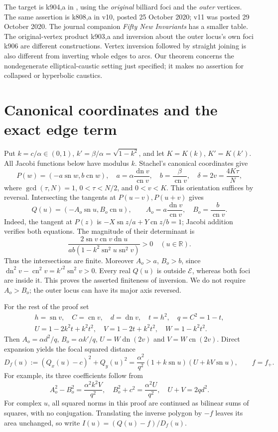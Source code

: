 \documentclass[11pt]{article}
\newcommand{\sn}{\operatorname{sn}}
\newcommand{\cn}{\operatorname{cn}}
\newcommand{\dn}{\operatorname{dn}}
\begin{document}
The target is k904,a in \cite[\S3.9, Table~10, p.~12]{RGK}, using the \emph{original} billiard foci and the \emph{outer} vertices. The same assertion is k808,a in v10, posted 25 October 2020; v11 was posted 29 October 2020. The journal companion \emph{Fifty New Invariants} has a smaller table. The original-vertex product k903,a and inversion about the outer locus's own foci k906 are different constructions. Vertex inversion followed by straight joining is also different from inverting whole edges to arcs. Our theorem concerns the nondegenerate elliptical-caustic setting just specified; it makes no assertion for collapsed or hyperbolic caustics.

\section{Canonical coordinates and the exact edge term}
Put $k=c/\alpha\in(0,1)$, $k'=\beta/\alpha=\sqrt{1-k^2}$, and let $K=K(k)$, $K'=K(k')$. All Jacobi functions below have modulus $k$. Stachel's canonical coordinates \cite[Theorem~4.3 and (4.9)]{Stachel} give
\begin{equation}\label{eq:canonical}
 P(w)=(-a\sn w,b\cn w),\quad
 a=\alpha\frac{\dn v}{\cn v},\quad b=\frac{\beta}{\cn v},\quad
 \delta=2v=\frac{4K\tau}{N},
\end{equation}
where $\gcd(\tau,N)=1$, $0<\tau<N/2$, and $0<v<K$. This orientation suffices by reversal. Intersecting the tangents at $P(u-v),P(u+v)$ gives
\begin{equation}\label{eq:outer}
 Q(u)=(-A_o\sn u,B_o\cn u),\qquad
 A_o=a\frac{\dn v}{\cn v},\quad B_o=\frac b{\cn v}.
\end{equation}
Indeed, the tangent at $P(z)$ is $-X\sn z/a+Y\cn z/b=1$; Jacobi addition verifies both equations. The magnitude of their determinant is
\[
 \frac{2\sn v\cn v\dn u}{ab(1-k^2\sn^2u\sn^2v)}>0
 \quad(u\in\mathbb R).
\]
Thus the intersections are finite. Moreover $A_o>a$, $B_o>b$, since $\dn^2v-\cn^2v=k'^2\sn^2v>0$. Every real $Q(u)$ is outside $\mathcal E$, whereas both foci are inside it. This proves the asserted finiteness of inversion. We do not require $A_o>B_o$; the outer locus can have its major axis reversed.

For the rest of the proof set
\begin{gather}\label{eq:defs}
 h=\sn v,\quad C=\cn v,\quad d=\dn v,\quad t=h^2,\quad q=C^2=1-t,\\
 U=1-2k^2t+k^2t^2,\quad V=1-2t+k^2t^2,\quad W=1-k^2t^2.\nonumber
\end{gather}
Then $A_o=\alpha d^2/q$, $B_o=\alpha k'/q$, $U=W\dn(2v)$ and $V=W\cn(2v)$. Direct expansion yields the focal squared distance
\begin{equation}\label{eq:distance}
 D_f(u):=(Q_x(u)-c)^2+Q_y(u)^2
 =\frac{\alpha^2}{q^2}(1+k\sn u)(U+kV\sn u),\qquad f=f_+.
\end{equation}
For example, its three coefficients follow from
\[
 A_o^2-B_o^2=\frac{\alpha^2 k^2V}{q^2},\quad
 B_o^2+c^2=\frac{\alpha^2U}{q^2},\quad U+V=2qd^2.
\]
For complex $u$, all squared norms in this proof are continued as bilinear sums of squares, with no conjugation. Translating the inverse polygon by $-f$ leaves its area unchanged, so write $I(u)=(Q(u)-f)/D_f(u)$.
\end{document}
